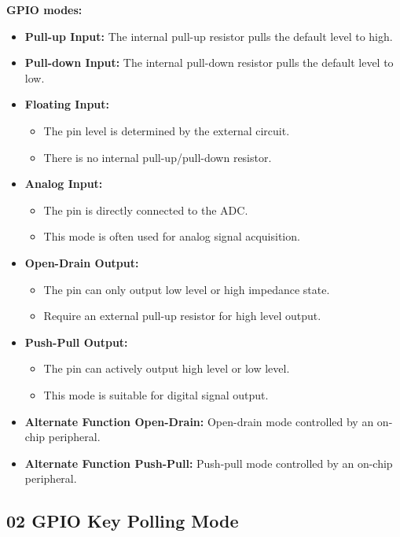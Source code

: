 \documentclass[12pt,a4paper]{ctexart}
\begin{document}
\textbf{GPIO modes:}
\begin{itemize}
    \item \textbf{Pull-up Input:} The internal pull-up resistor pulls the default level to high.
    \item \textbf{Pull-down Input:} The internal pull-down resistor pulls the default level to low.
    \item \textbf{Floating Input:}
          \begin{itemize}
              \item The pin level is determined by the external circuit.
              \item There is no internal pull-up/pull-down resistor.
          \end{itemize}
    \item \textbf{Analog Input:}
          \begin{itemize}
              \item The pin is directly connected to the ADC.
              \item This mode is often used for analog signal acquisition.
          \end{itemize}
    \item \textbf{Open-Drain Output:}
          \begin{itemize}
              \item The pin can only output low level or high impedance state.
              \item Require an external pull-up resistor for high level output.
          \end{itemize}
    \item \textbf{Push-Pull Output:}
          \begin{itemize}
              \item The pin can actively output high level or low level.
              \item This mode is suitable for digital signal output.
          \end{itemize}
    \item \textbf{Alternate Function Open-Drain:} Open-drain mode controlled by an on-chip peripheral.
    \item \textbf{Alternate Function Push-Pull:} Push-pull mode controlled by an on-chip peripheral.
\end{itemize}

\subsection{02 GPIO Key Polling Mode}
\end{document}
